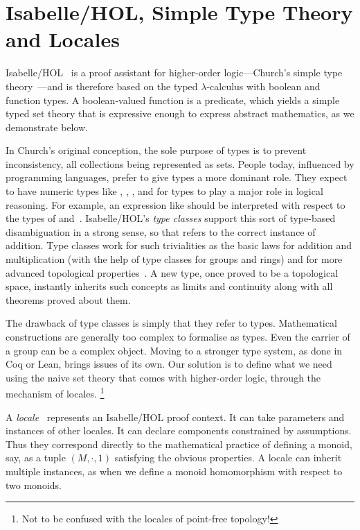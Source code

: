 \documentclass[12pt]{scrartcl}
\begin{document}
\section{Isabelle/HOL, Simple Type Theory and Locales}
\label{sec:isabelle}

Isabelle/HOL~\cite{isa-tutorial} is a proof assistant for higher-order logic---Church's simple type theory~\cite{church40}---and is therefore based on the typed $\lambda$-calculus with boolean and function types. A boolean-valued function is a predicate, which yields a simple typed set theory that is expressive enough to express abstract mathematics, as we demonstrate below. 

In Church's original conception, the sole purpose of types is to prevent inconsistency, all collections being represented as sets. People today, influenced by programming languages, prefer to give types a more dominant role. They expect to have numeric types like , , ,  and for types to play a major role in logical reasoning. For example, an expression like  should be interpreted with respect to the types of  and~.
Isabelle/HOL's \emph{type classes} \cite{wenzel-type} support this sort of type-based disambiguation in a strong sense, so that  refers to the correct instance of addition.
Type classes work for such trivialities as the basic laws for addition and multiplication (with the help of type classes for groups and rings) and for more advanced topological properties~\cite{hoelzl-filters}. A new type, once proved to be a topological space, instantly inherits such concepts as limits and continuity along with all theorems proved about them.

The drawback of type classes is simply that they refer to types. Mathematical constructions are generally too complex to formalise as types. Even the carrier of a group can be a complex object. Moving to a stronger type system, as done in Coq or Lean, brings issues of its own. Our solution is to define what we need using the naive set theory that comes with higher-order logic, through the mechanism of locales.%
\footnote{Not to be confused with the locales of point-free topology!}

A \emph{locale}~\cite{ballarin-locales-module} represents an Isabelle/HOL proof context. It can take parameters and instances of other locales. It can declare components constrained by assumptions. Thus they correspond directly to the mathematical practice of defining a monoid, say, as a tuple $(M,\cdot ,1)$ satisfying the obvious properties. 
A locale can inherit multiple instances, as when we define a monoid homomorphism with respect to two monoids.
\end{document}
